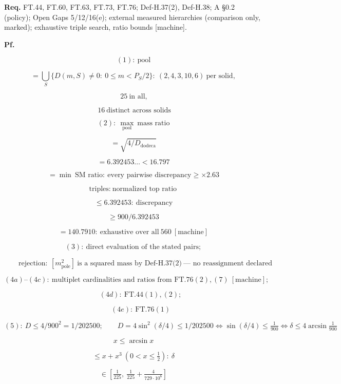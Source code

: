 \documentclass[11pt,openany]{report}
\theoremstyle{canonplain}
\theoremstyle{canondef}
\begin{document}
\textbf{Req.} FT.44, FT.60, FT.63, FT.73, FT.76; Def-H.37(2), Def-H.38; A §0.2 (policy); Open Gaps 5/12/16(e); external measured hierarchies (comparison only, marked); exhaustive triple search, ratio bounds [machine].

\textbf{Pf.}

\[
(1):\ \text{pool}
\]

\[
= \bigcup_S\{D(m,S)\ne0:\ 0\le m<P_S/2\}:\ (2,4,3,10,6)\ \text{per solid},
\]

\[
\ 25\ \text{in all},
\]

\[
\ 16\ \text{distinct across solids}
\]

\[
(2):\ \max_{\text{pool}}\ \text{mass ratio}
\]

\[
= \sqrt{4/D_{\mathrm{dodeca}}}
\]

\[
= 6.392453\ldots<16.797
\]

\[
= \min\ \text{SM ratio}:\ \text{every pairwise discrepancy}\ge\times2.63
\]

\[
\text{triples}:\ \text{normalized top ratio}
\]

\[
\le 6.392453:\ \text{discrepancy}
\]

\[
\ge 900/6.392453
\]

\[
= 140.7910:\ \text{exhaustive over all}\ 560\ [\text{machine}]
\]

\[
(3):\ \text{direct evaluation of the stated pairs};
\]

\[
\qquad \text{rejection}:\ [m^2_{\mathrm{pole}}]\ \text{is a squared mass by Def-H.37(2)}\ \text{— no reassignment declared}
\]

\[
(4a)\text{–}(4c):\ \text{multiplet cardinalities and ratios from FT.76}(2),(7)\ [\text{machine}];
\]

\[
\qquad (4d):\ \mathrm{FT.44}(1),(2);
\]

\[
\qquad (4e):\ \mathrm{FT.76}(1)
\]

\[
(5):\ D\le4/900^2=1/202500;\qquad D=4\sin^2(\delta/4)\le1/202500\iff\sin(\delta/4)\le\tfrac1{900}\iff\delta\le4\arcsin\tfrac1{900}
\]

\[
x\le\arcsin x
\]

\[
\le x+x^3\ (0<x\le\tfrac12):\ \delta
\]

\[
\in [\tfrac1{225},\ \tfrac1{225}+\tfrac{4}{729\cdot10^6}]
\]
\end{document}
